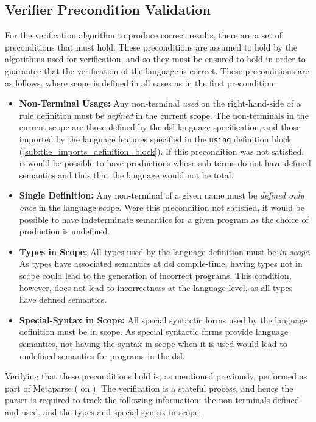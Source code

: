 \subsection{Verifier Precondition Validation} %
\label{sub:verifier_precondition_validation}
For the verification algorithm to produce correct results, there are a set of preconditions that must hold. 
These preconditions are assumed to hold by the algorithms used for verification, and so they must be ensured to hold in order to guarantee that the verification of the language is correct.
These preconditions are as follows, where scope is defined in all cases as in the first precondition:
\begin{itemize}
    \item \label{item:non_terminal_usage} \textbf{Non-Terminal Usage:} Any non-terminal \textit{used} on the right-hand-side of a rule definition must be \textit{defined} in the current scope. 
    The non-terminals in the current scope are those defined by the \gls{dsl} language specification, and those imported by the language features specified in the \texttt{using} definition block (\autoref{sub:the_imports_definition_block}).
    If this precondition was not satisfied, it would be possible to have productions whose sub-terms do not have defined semantics and thus that the language would not be total. 
    \item \textbf{Single Definition:} Any non-terminal of a given name must be \textit{defined only once} in the language scope.
    Were this precondition not satisfied, it would be possible to have indeterminate semantics for a given program as the choice of production is undefined.
    \item \textbf{Types in Scope:} All types used by the language definition must be \textit{in scope}.
    As types have associated semantics at \gls{dsl} compile-time, having types not in scope could lead to the generation of incorrect programs. 
    This condition, however, does not lead to incorrectness at the language level, as all types have defined semantics.
    \item \textbf{Special-Syntax in Scope:} All special syntactic forms used by the language definition must be in scope.
    As special syntactic forms provide language semantics, not having the syntax in scope when it is used would lead to undefined semantics for programs in the \gls{dsl}. 
\end{itemize}

Verifying that these preconditions hold is, as mentioned previously, performed as part of Metaparse ( on ).
The verification is a stateful process, and hence the parser is required to track the following information: the non-terminals defined and used, and the types and special syntax in scope. 

